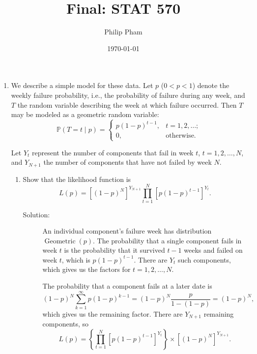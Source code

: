 \documentclass[letterpaper,11pt]{article}
\title{Final: STAT 570}
\author{Philip Pham}
\date{\today}
\begin{document}
\maketitle
\begin{enumerate}
\item We describe a simple model for these data. Let $p$ ($0 < p < 1$) denote
  the weekly failure probability, i.e., the probability of failure during any
  week, and $T$ the random variable describing the week at which failure
  occurred. Then $T$ may be modeled as a geometric random variable:
  \begin{equation}
    \mathbb{P}\left(T = t \mid p\right)
    = \begin{cases}
      p\left(1-p\right)^{t-1}, &t=1,2,\ldots; \\
      0,&\text{otherwise}.      
    \end{cases}
    \label{eqn:p1_model}
  \end{equation}

  Let $Y_t$ represent the number of components that fail in week $t$,
  $t = 1,2,\ldots,N$, and $Y_{N+1}$ the number of components that have not failed
  by week $N$.

  \begin{enumerate}
  \item Show that the likelihood function is
    \begin{equation}
      L\left(p\right) =
      \left[\left(1 - p\right)^N\right]^{Y_{N+1}}
      \prod_{t=1}^N\left[
        p\left(1 - p\right)^{t-1}
      \right]^{Y_t}.
      \label{eqn:p1_likelihood}      
    \end{equation}
    \begin{description}
    \item[Solution:] An individual component's failure week has distribution
      $\operatorname{Geometric}\left(p\right)$. The probability that a single
      component fails in week $t$ is the probability that it survived $t - 1$
      weeks and failed on week $t$, which is $p\left(1 - p\right)^{t-1}$. There
      are $Y_t$ such components, which gives us the factors for
      $t = 1,2,\ldots,N$.

      The probability that a component fails at a later date is
      \[
        \left(1 - p\right)^N\sum_{k=1}^\infty p\left(1-p\right)^{k-1}
        =
        \left(1 - p\right)^N\frac{p}{1 - \left(1 - p\right)}
        =
        \left(1 - p\right)^N,
      \]
      which gives us the remaining factor. There are $Y_{N+1}$ remaining
      components, so
      \[
        L\left(p\right) =
        \left\{
          \prod_{t=1}^N \left[
            p\left(1 - p \right)^{t-1}
          \right]^{Y_t}
        \right\}
        \times
        \left[\left(1-p\right)^N\right]^{Y_{N+1}}.
      \]
    \end{description}
  \end{enumerate}
\end{enumerate}
\end{document}
